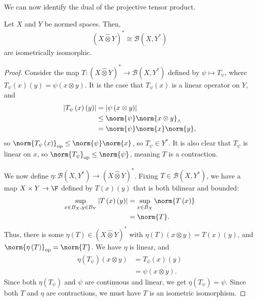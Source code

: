 \documentclass[10pt]{mypackage}
\begin{document}
We can now identify the dual of the projective tensor product.
\begin{proposition}
  Let $X$ and $Y$ be normed spaces. Then,
  \begin{align*}
    \left(X\hat\otimes Y\right)^{\ast}\cong \mathcal{B}\left(X,Y^{\ast}\right)
  \end{align*}
  are isometrically isomorphic.
\end{proposition}
\begin{proof}
  Consider the map $T: \left(X\hat\otimes Y\right)^{\ast}\rightarrow \mathcal{B}\left(X,Y^{\ast}\right)$ defined by $\psi \mapsto T_{\psi}$, where $T_{\psi}\left(x\right)\left(y\right) = \psi\left(x\otimes y\right)$. It is the case that $T_{\psi}\left(x\right)$ is a linear operator on $Y$, and
  \begin{align*}
    \left\vert T_{\psi}\left(x\right)\left(y\right) \right\vert &= \left\vert \psi\left(x\otimes y\right) \right\vert\\
                                                                &\leq \norm{\psi}\norm{x\otimes y}_{\wedge}\\
                                                                &= \norm{\psi}\norm{x}\norm{y},
  \end{align*}
  so $\norm{T_{\psi}\left(x\right)}_{\text{op}}\leq \norm{\psi}\norm{x}$, so $T_{\psi}\in Y^{\ast}$. It is also clear that $T_{\psi}$ is linear on $x$, so $\norm{T_{\psi}}_{\text{op}}\leq \norm{\psi}$, meaning $T$ is a contraction.\newline

  We now define $\eta: \mathcal{B}\left(X,Y^{\ast}\right)\rightarrow \left(X\hat\otimes Y\right)^{\ast}$. Fixing $T\in \mathcal{B}\left(X,Y^{\ast}\right)$, we have a map $X\times Y\rightarrow \F$ defined by $T\left(x\right)\left(y\right)$ that is both bilinear and bounded:
  \begin{align*}
    \sup_{x\in B_X,y\in B_Y}\left\vert T\left(x\right)\left(y\right) \right\vert &= \sup_{x\in B_X}\norm{T\left(x\right)}\\
                                                                                 &= \norm{T}.
  \end{align*}
  Thus, there is some $\eta\left(T\right)\in \left(X\hat\otimes Y\right)^{\ast}$ with $\eta\left(T\right)\left(x\otimes y\right) = T\left(x\right)\left(y\right)$, and $\norm{\eta\left(T\right)}_{\text{op}} = \norm{T}$. We have $\eta$ is linear, and
  \begin{align*}
    \eta\left(T_{\psi}\right)\left(x\otimes y\right) &= T_{\psi}\left(x\right)\left(y\right)\\
                                                     &= \psi\left(x\otimes y\right).
  \end{align*}
  Since both $\eta\left(T_{\psi}\right)$ and $\psi$ are continuous and linear, we get $\eta\left(T_{\psi}\right) = \psi$. Since both $T$ and $\eta$ are contractions, we must have $T$ is an isometric isomorphism.
\end{proof}
\end{document}
